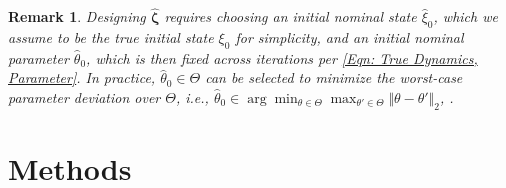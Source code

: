 \documentclass[letterpaper, 10 pt, conference]{ieeeconf}
\newcommand{\?}{\stackrel{?}{=}}
\newcommand{\param}{\theta}
\newcommand{\paramSet}{\Theta}
\newcommand{\var}{\xi}
\newcommand{\varNominal}{\hat\var}
\newcommand{\paramNominal}{\hat\param}
\newcommand{\ratePGDNominal}{\hat\ratePGD}
\newcommand{\ratePGD}{\alpha}
\newcommand{\iterationHorizon}{N}
\newcommand{\state}{\zeta}
\newcommand{\stateNominalStacked}{\hat{\boldsymbol{\state}}}
\newtheorem{remark}{Remark}
\newcommand{\antoine}[1]{{\textcolor[rgb]{1,0,0}{\textsf{[Antoine: {#1}]}}}}
\begin{document}
\begin{remark}
\label{Remark: Choice of Initial Nominal Parameter, paramNominal 0}
Designing $\stateNominalStacked$ requires choosing
an initial nominal state $\varNominal_0$, which we assume to be the true initial state $\var_0$ for simplicity, and an initial nominal parameter $\paramNominal_0$, which is then fixed across iterations per \eqref{Eqn: True Dynamics, Parameter}.
In practice, 
$\paramNominal_0 \in \paramSet$ can be selected to minimize the worst-case parameter deviation over $\paramSet$, i.e., $\paramNominal_0 \in \arg\min_{\param \in  \paramSet} \max_{\param' \in \paramSet} \Vert \param - \param' \Vert_2$, .
\end{remark}



\section{Methods}
\label{sec: Methods}
\end{document}
